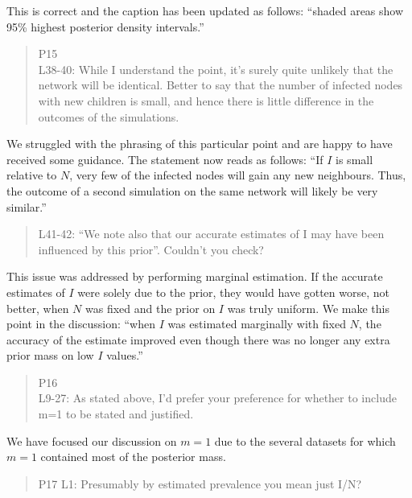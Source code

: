 \documentclass[12pt]{letter}
\begin{document}
\begin{letter}{ }
This is correct and the caption has been updated as follows: ``shaded areas
show 95\% highest posterior density intervals.''

\begin{quote}
  \itshape

  P15 \\
  L38-40: While I understand the point, it's surely quite unlikely that the
  network will be identical. Better to say that the number of infected nodes
  with new children is small, and hence there is little difference in the
  outcomes of the simulations.
\end{quote}

We struggled with the phrasing of this particular point and are happy to have
received some guidance. The statement now reads as follows: ``If $I$ is small
relative to $N$, very few of the infected nodes will gain any new neighbours.
Thus, the outcome of a second simulation on the same network will likely be
very similar.''

\begin{quote}
  \itshape

  L41-42: ``We note also that our accurate estimates of I may have been
  influenced by this prior''. Couldn't you check?
\end{quote}

This issue was addressed by performing marginal estimation. If the accurate
estimates of $I$ were solely due to the prior, they would have gotten worse,
not better, when $N$ was fixed and the prior on $I$ was truly uniform. We make
this point in the discussion: ``when $I$ was estimated marginally with fixed
$N$, the accuracy of the estimate improved even though there was no longer any
extra prior mass on low $I$ values.''

\begin{quote}
  \itshape

  P16 \\
  L9-27: As stated above, I'd prefer your preference for whether to include m=1
  to be stated and justified.
\end{quote}

We have focused our discussion on $m = 1$ due to the several datasets for which
$m = 1$ contained most of the posterior mass.

\begin{quote}
  \itshape

  P17
  L1: Presumably by estimated prevalence you mean just I/N?
\end{quote}


\end{letter}
\end{document}
